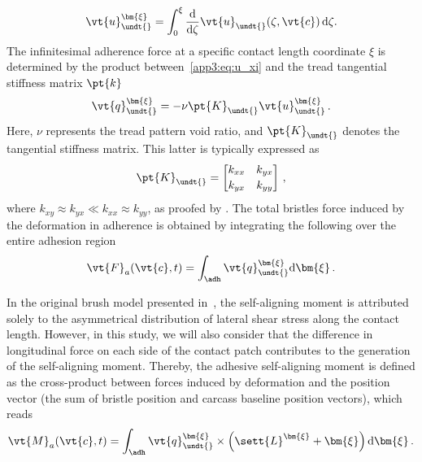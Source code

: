 %
\begin{equation}
  \vt{u}_{\undt{}}^{\bm{\xi}} = \int_0^\xi \dfrac{\mathrm{d}}{\mathrm{d}\zeta}\vt{u}_{\undt{}}(\zeta,\vt{c}) \,\mathrm{d}\zeta.
  \label{app3:eq:u_xi}
\end{equation}
%
The infinitesimal adherence force at a specific contact length coordinate $\xi$ is determined by the product between~\eqref{app3:eq:u_xi} and the tread tangential stiffness matrix $\pt{k}$
%
\begin{equation*}
  \vt{q}_{\undt{}}^{\bm{\xi}} = -\nu\pt{K}_{\undt{}}\vt{u}_{\undt{}}^{\bm{\xi}} \, \text{.}
\end{equation*}
%
Here, $\nu$ represents the tread pattern void ratio, and $\pt{K}_{\undt{}}$ denotes the tangential stiffness matrix. This latter is typically expressed as
%
\begin{equation*}
  \pt{K}_{\undt{}} =
  \begin{bmatrix}
    k_{xx} & k_{yx} \\[0.2em]
    k_{yx} & k_{yy}
  \end{bmatrix} \, \text{,}
\end{equation*}
%
where $k_{xy} \approx k_{yx} \ll k_{xx} \approx k_{yy}$, as proofed by \citet{okonieski2003simpified}. The total bristles force induced by the deformation in adherence is obtained by integrating the following over the entire adhesion region \adh{}
%
\begin{equation}
  \vt{F}_a(\vt{c},t) = \int_{\adh} \vt{q}_{\undt{}}^{\bm{\xi}} \mathrm{d}\bm{\xi} \, \text{.}
  \label{app3:eq:F_a}
\end{equation}

In the original brush model presented in~\cite{pacejka2012tire}, the self-aligning moment is attributed solely to the asymmetrical distribution of lateral shear stress along the contact length. However, in this study, we will also consider that the difference in longitudinal force on each side of the contact patch contributes to the generation of the self-aligning moment. Thereby, the adhesive self-aligning moment is defined as the cross-product between forces induced by deformation and the position vector (the sum of bristle position and carcass baseline position vectors), which reads
%
\begin{equation}
  \vt{M}_{a}(\vt{c},t) = \int_{\adh} \vt{q}_{\undt{}}^{\bm{\xi}} \times \left(\sett{L}^{\bm{\xi}} + \bm{\xi}\right) \mathrm{d}\bm{\xi} \, \text{.}
  \label{app3:eq:M_a}
\end{equation}

